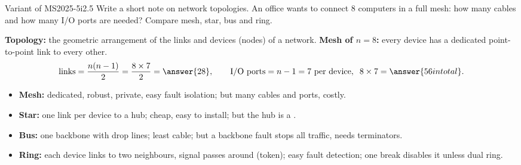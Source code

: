 \begin{question}{Variant of MS2025-5i}{2.5}
Write a short note on network topologies. An office wants to connect 8 computers in a full mesh: how many cables and how many I/O ports are needed? Compare mesh, star, bus and ring.
\end{question}
\begin{solution}
\textbf{Topology:} the geometric arrangement of the links and devices (nodes) of a network.
\textbf{Mesh of $n=8$:} every device has a dedicated point-to-point link to every other.
\[ \text{links} = \frac{n(n-1)}{2} = \frac{8\times7}{2} = \answer{28}, \qquad \text{I/O ports} = n-1 = 7 \text{ per device}, \;\; 8\times7=\answer{56 in total}. \]
\begin{itemize}
\item \textbf{Mesh:} dedicated, robust, private, easy fault isolation; but many cables and ports, costly.
\item \textbf{Star:} one link per device to a hub; cheap, easy to install; but the hub is a .
\item \textbf{Bus:} one backbone with drop lines; least cable; but a backbone fault stops all traffic, needs terminators.
\item \textbf{Ring:} each device links to two neighbours, signal passes around (token); easy fault detection; one break disables it unless dual ring.
\end{itemize}
\end{solution}


